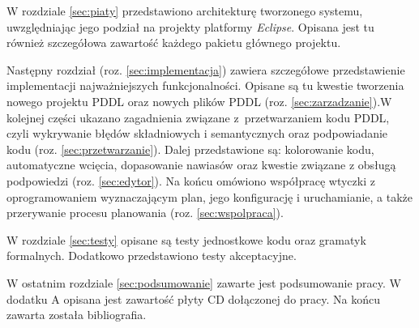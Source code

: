W rozdziale \ref{sec:piaty}\JP{!!} przedstawiono architekturę tworzonego systemu, uwzględniając jego podział na projekty platformy \emph{Eclipse}. Opisana jest tu również szczegółowa zawartość każdego pakietu głównego projektu.

Następny rozdział (roz. \ref{sec:implementacja}\JP{!!}) zawiera szczegółowe przedstawienie implementacji najważniejszych funkcjonalności. Opisane są tu kwestie tworzenia nowego projektu PDDL oraz nowych plików PDDL (roz. \ref{sec:zarzadzanie}\JP{!!}).W kolejnej części ukazano zagadnienia związane z~przetwarzaniem kodu PDDL, czyli wykrywanie błędów składniowych i semantycznych oraz podpowiadanie kodu (roz. \ref{sec:przetwarzanie}). Dalej przedstawione są: kolorowanie kodu, automatyczne wcięcia, dopasowanie nawiasów oraz kwestie związane z obsługą podpowiedzi (roz. \ref{sec:edytor}).  Na końcu omówiono współpracę wtyczki z oprogramowaniem wyznaczającym plan, jego konfigurację i uruchamianie, a także przerywanie procesu planowania (roz. \ref{sec:wspolpraca}).

W rozdziale \ref{sec:testy} opisane są testy jednostkowe kodu oraz gramatyk formalnych. Dodatkowo przedstawiono testy akceptacyjne.

W ostatnim rozdziale \ref{sec:podsumowanie} zawarte jest podsumowanie pracy. W dodatku A opisana jest zawartość płyty CD dołączonej do pracy. Na końcu zawarta została bibliografia.
